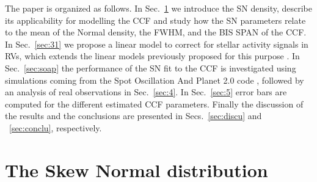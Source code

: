 \documentclass{aa}
\begin{document}

The paper is organized as follows. In Sec.~\ref{sec:2} we introduce the SN density, describe its applicability for modelling the CCF and study how the SN parameters relate to the mean of the Normal density, the FWHM, and the BIS SPAN of the CCF. 
%
In Sec.~\ref{sec:31} we propose a linear model to correct for stellar activity signals in RVs, which extends the linear models previously proposed for this purpose \citep[e.g.][]{Dumusque:2017aa,Feng:2017aa}. 
%
In Sec.~\ref{sec:soap} the performance of the SN fit to the CCF is investigated using simulations coming from the Spot Oscillation And Planet 2.0 code \citep[SOAP 2.0,][]{Dumusque-2014b}, followed by an analysis of real observations in Sec.~\ref{sec:4}.
%
In Sec.~\ref{sec:5} error bars are computed for the different estimated CCF parameters. Finally the discussion of the results and the conclusions are presented in Secs.~\ref{sec:discu} and ~\ref{sec:conclu}, respectively.

\section{The Skew Normal distribution} \label{sec:2}
\end{document}
